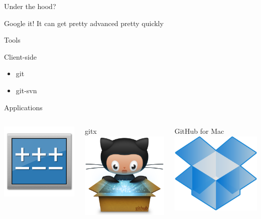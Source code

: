 \begin{frame}{Under the hood?}
    \begin{block}{Google it!}
        It can get pretty advanced pretty quickly
    \end{block}
\end{frame}

\begin{frame}{Tools}
    \begin{block}{Client-side}
        \begin{itemize}
            \item git
            \item git-svn
        \end{itemize}
    \end{block}
    \begin{block}{Applications}
        \begin{columns}[c] %
            \centering
            \includegraphics[width=0.4\linewidth]{img/gitx.png}

            gitx
            \centering
            \includegraphics[width=0.4\linewidth]{img/githubformac.png}

            GitHub for Mac
            \centering
            \includegraphics[width=0.4\linewidth]{img/dropbox.png}


\end{columns}
\end{block}
\end{frame}
